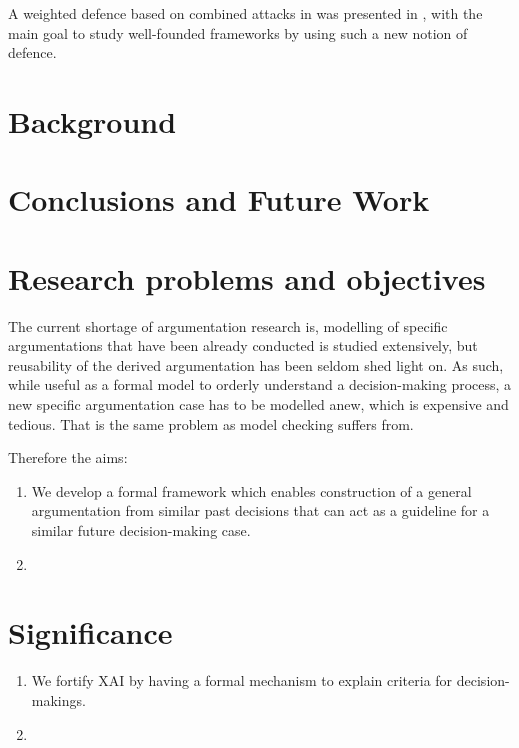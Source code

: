 \documentclass{llncs}%
\newcommand{\ryuta}[1]{{\color{magenta}{#1}}}
\begin{document}
A weighted defence based on  combined attacks in \cite{parsons06} was presented in \cite{wcombined}, with the main goal to study well-founded frameworks by using such a new notion of defence. 


\section{Background}\label{sec:bg}



\section{Conclusions and Future Work}\label{sec:conclusion}





\pagebreak 

\section*{Research problems and objectives} 
The current shortage of argumentation research \ryuta{correct me if this is not correct....} is, 
modelling of specific argumentations that have been already conducted is studied extensively, but reusability of the derived
argumentation has been seldom shed light on. As such, while useful as a formal model to orderly understand a decision-making process,  
a new specific argumentation case has to be modelled anew, which is expensive and tedious. That is the same problem 
as model checking suffers from. 

Therefore the aims: 
\begin{enumerate} 
	\item  We develop a formal framework which enables construction of a general argumentation from similar past decisions that 
		can act as a guideline for a similar future decision-making case. 
	\item 
\end{enumerate}

\section*{Significance} 
\begin{enumerate} 
	\item We fortify XAI by having a formal mechanism to explain criteria for decision-makings. 
	\item 
\end{enumerate}

\end{document}
